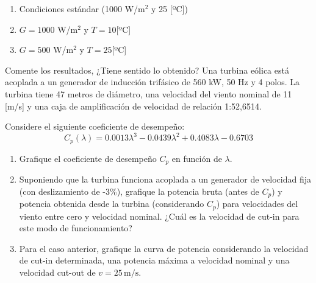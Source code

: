 \documentclass[
  11pt,
  letterpaper,
   addpoints,
   answers
  ]{exam}
\begin{document}
\begin{questions}
    \begin{enumerate}
        \item Condiciones estándar (1000 W/m$^2$ y 25 [ºC])
        \item $G = 1000$ W/m$^2$ y $T = 10$[ºC]
        \item $G = 500$ W/m$^2$ y $T = 25$[ºC]
    \end{enumerate}
    
    Comente los resultados, ¿Tiene sentido lo obtenido?
    \question 
    Una turbina eólica está acoplada a un generador de inducción trifásico de 560 kW, 50 Hz y 4 polos. La turbina tiene 47 metros de diámetro, una velocidad del viento nominal de 11 [m/s] y una caja de amplificación de velocidad de relación 1:52,6514.
    
    Considere el siguiente coeficiente de desempeño:
    \[
    C_p(\lambda) = 0.0013\lambda^3 - 0.0439\lambda^2 + 0.4083\lambda - 0.6703
    \]
    
    \begin{enumerate}
        \item Grafique el coeficiente de desempeño \( C_p \) en función de \( \lambda \).
        
        \item Suponiendo que la turbina funciona acoplada a un generador de velocidad fija (con deslizamiento de -3\%), grafique la potencia bruta (antes de \( C_p \)) y potencia obtenida desde la turbina (considerando \( C_p \)) para velocidades del viento entre cero y velocidad nominal. ¿Cuál es la velocidad de cut-in para este modo de funcionamiento?
        
        \item Para el caso anterior, grafique la curva de potencia considerando la velocidad de cut-in determinada, una potencia máxima a velocidad nominal y una velocidad cut-out de \( v = 25 \, \text{m/s} \).
    \end{enumerate}
\end{questions}
\newpage
\end{document}
